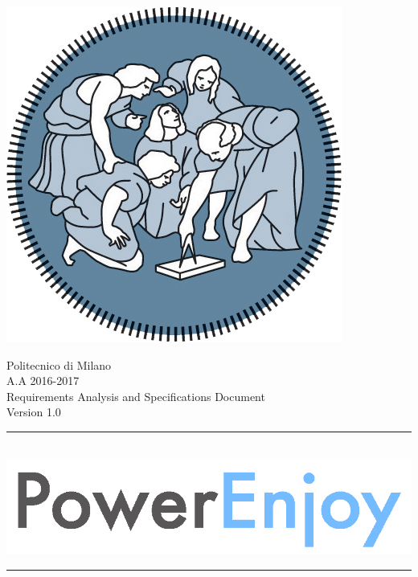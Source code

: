 \documentclass[12pt]{article}
\begin{document}
   
	\begin{center}
 	 	\includegraphics[scale=1.5]{Images/PolimiLogo.png}
	\end{center}

	\begin{center}
	 	{\Huge Politecnico di Milano}\\
	 	\vspace{5mm}
		{\Large A.A 2016-2017} 
		\vspace{5mm}\\
		{\huge Requirements Analysis and Specifications Document}   
		\vspace{5mm}\\
		{\large Version 1.0}  
    \end{center}
     
    \begin{center}
		\noindent\rule{8cm}{0.8pt}
		 \vspace{5mm}\\
 	 	 \includegraphics[scale=1]{Images/logoPowerEnjoy2.png}\\
		\noindent\rule{8cm}{0.8pt}
	\end{center}
	 	\vspace{5mm}
	 		
\end{document}
